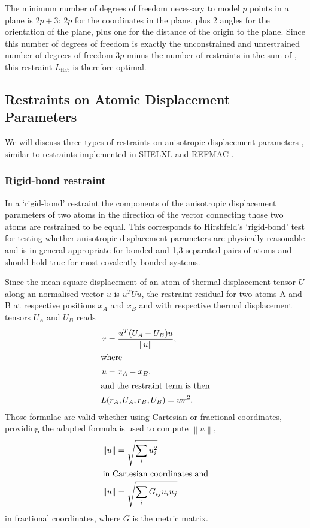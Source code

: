 \documentclass[11pt]{article}
\newcommand{\norm}[1]{\left\| #1 \right\|}
\begin{document}
The minimum number of degrees of freedom necessary to model $p$ points in a plane is $2p+3$: $2p$ for the coordinates in the plane, plus 2 angles for the orientation of the plane, plus one for the distance of the origin to the plane. Since this number of degrees of freedom is exactly the unconstrained and unrestrained number of degrees of freedom $3p$ minus the number of restraints in the sum of , this restraint $L_\text{flat}$ is therefore optimal.

\subsection{Restraints on Atomic Displacement Parameters}

We will discuss three types of restraints on anisotropic displacement parameters \cite{Rollett:1970ab}, similar to restraints implemented in SHELXL and REFMAC \cite{Murshudov:1999aa}.

\subsubsection{Rigid-bond restraint}

In a `rigid-bond' restraint the components of the anisotropic displacement parameters of two atoms in the direction of the vector connecting those two atoms are restrained to be equal. This corresponds to Hirshfeld's `rigid-bond' test \cite{Hirshfeld:1976aa} for testing whether anisotropic displacement parameters are physically reasonable \cite{Sheldrick:1997aa} and is in general appropriate for bonded and 1,3-separated pairs of atoms and should hold true for most covalently bonded systems.

Since the mean-square displacement of an atom of thermal displacement tensor $U$ along an normalised vector $u$ is $u^T U u$, the restraint residual for two atoms A and B at respective positions $x_A$ and $x_B$ and with respective thermal displacement tensors $U_A$ and $U_B$ reads
\begin{align}
\label{eqn:rigid_bond}
r &= \frac{u^T (U_A - U_B) u}{\norm{u}},\\
\intertext{where}
u &= x_A - x_B, \\
\intertext{and the restraint term is then}
L&(r_A, U_A, r_B, U_B) = w r^2.
\end{align}
Those formulae are valid whether using Cartesian or fractional coordinates, providing the adapted formula is used to compute $\norm{u}$, 
\begin{align}
\norm{u} &= \sqrt{\sum_i u_i^2}\\
\intertext{in Cartesian coordinates and}
\norm{u} &= \sqrt{\sum_i G_{ij} u_i u_j}
\end{align}
in fractional coordinates, where $G$ is the metric matrix.
\end{document}
